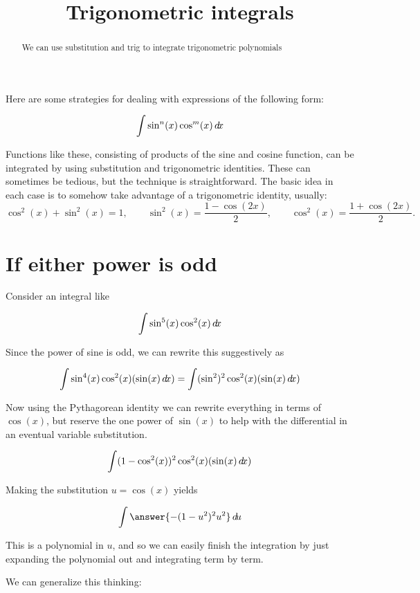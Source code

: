 \documentclass{ximera}
\title[Dig-In:]{Trigonometric integrals}
\begin{document}
\begin{abstract}
	We can use substitution and trig to integrate trigonometric polynomials
\end{abstract}
\maketitle

Here are some strategies for dealing with expressions of the following form:

\[
\int \sin^n(x)\cos^m(x) \mathop{}\!d\! x
\]

Functions like these, consisting of products of the sine and cosine function, can be
integrated by using substitution and trigonometric identities. These
can sometimes be tedious, but the technique is straightforward. The
basic idea in each case is to somehow take advantage of a
trigonometric identity, usually:
\[
\cos^2(x) + \sin^2(x) = 1, \qquad \sin^2(x) = \frac{1-\cos(2x)}{2}, \qquad \cos^2(x)= \frac{1+\cos(2x)}{2}.
\]

\section{If either power is odd}

\begin{example}
Consider an integral like 

\[
\int \sin^5(x) \cos^2(x) \mathop{}\!d\! x
\]

Since the power of sine is odd, we can rewrite this suggestively as

\[
\int \sin^4(x) \cos^2(x) (\sin(x) \mathop{}\!d\! x) = \int (\sin^2)^2 \cos^2(x) (\sin(x) \mathop{}\!d\! x)
\]

Now using the Pythagorean identity we can rewrite everything in terms of $\cos(x)$, 
but reserve the one power of $\sin(x)$ to help with the differential in an eventual variable substitution.

\[
\int (1-\cos^2(x))^2 \cos^2(x) (\sin(x) \mathop{}\!d\! x)
\]


Making the substitution $u = \cos(x)$ yields

\[
\int \answer{-(1-u^2)^2 u^2} \d u
\]

This is a polynomial in $u$, and so we can easily finish the integration by just expanding the polynomial out and integrating term by term.
\end{example}

We can generalize this thinking:
\end{document}
